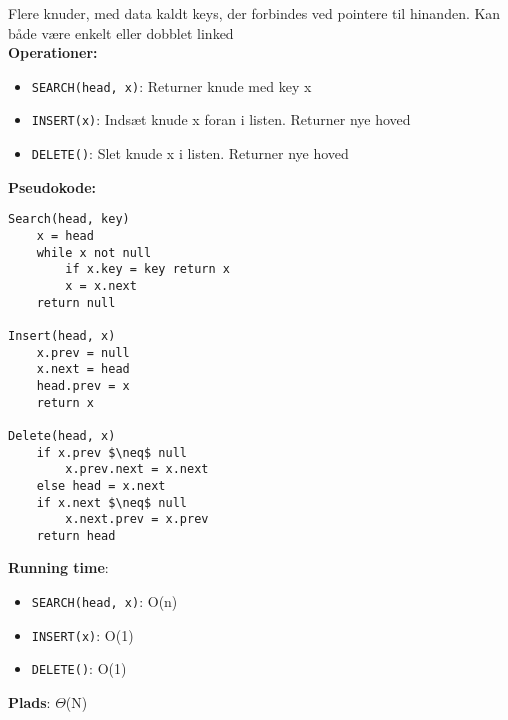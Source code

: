 Flere knuder, med data kaldt keys, der forbindes ved pointere til hinanden. Kan både være enkelt eller dobblet linked\\
\textbf{Operationer:}
\begin{itemize}
	\item \texttt{SEARCH(head, x)}: Returner knude med key x
	\item \texttt{INSERT(x)}: Indsæt knude x foran i listen. Returner nye hoved
	\item \texttt{DELETE()}: Slet knude x i listen. Returner nye hoved
\end{itemize}
\textbf{Pseudokode:}
\begin{lstlisting}[frame=single, mathescape=true]
Search(head, key)
	x = head
	while x not null
		if x.key = key return x
		x = x.next
	return null

Insert(head, x)
	x.prev = null
	x.next = head
	head.prev = x
	return x

Delete(head, x)
	if x.prev $\neq$ null
		x.prev.next = x.next
	else head = x.next
	if x.next $\neq$ null
		x.next.prev = x.prev
	return head
\end{lstlisting}
\textbf{Running time}:
\begin{itemize}
	\item \texttt{SEARCH(head, x)}: O(n)
	\item \texttt{INSERT(x)}: O(1)
	\item \texttt{DELETE()}: O(1)
\end{itemize}
\textbf{Plads}: $\Theta$(N)
